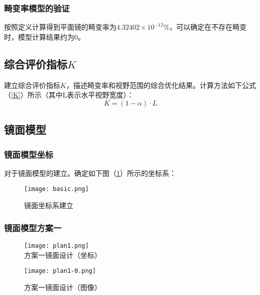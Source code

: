 \documentclass[bwprint]{cumcmthesis}
\begin{document}
\subsubsection{畸变率模型的验证}

\par 按照定义计算得到平面镜的畸变率为$4.32402\times 10^{-12}\%$，可以确定在不存在畸变时，模型计算结果约为0。


\subsection{综合评价指标$K$}
\par 建立综合评价指标$K$，描述畸变率和视野范围的综合优化结果。计算方法如下公式（\ref{K}）所示（其中L表示水平视野宽度）：
\begin{equation}
\label{K}
	K = (1 - \alpha) \cdot L
\end{equation}

\subsection{镜面模型}
\subsubsection{镜面模型坐标}

\par 对于镜面模型的建立。确定如下图（\ref{basic}）所示的坐标系：

\begin{figure}[!htb]
\centering
\texttt{[image: basic.png]}
\caption{镜面坐标系建立}
\label{basic}
\end{figure}


\subsubsection{镜面模型方案一}

\begin{figure}[!htbp]  
\begin{minipage}[t]{0.5\textwidth}
\centering  
\texttt{[image: plan1.png]} \\
\caption{方案一镜面设计（坐标）} \label{plan1}
\end{minipage}
\hspace{1ex}
\begin{minipage}[t]{0.5\textwidth}  
\centering  
\texttt{[image: plan1-0.png]}\\
\caption{方案一镜面设计（图像）}  \label{plan1-0}
\end{minipage}  
\end{figure} 
\end{document}
